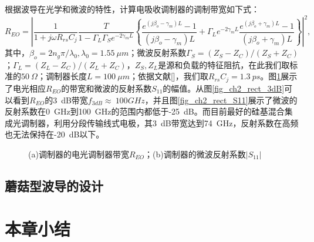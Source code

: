 根据波导在光学和微波的特性，计算电吸收调制器的调制带宽如下式\cite{li1999ultrahigh, tang2008design}：
\begin{equation}
\label{Equ:eoresponse}
R_{EO} = \left|\frac{1}{1+j\omega R_{rs} C_j}\frac{T}{1-\Gamma_L \Gamma_S  e^{-2 \gamma_m L} } \left\{\frac{e^{(j\beta_o-\gamma_m)L}-1}{(j\beta_o-\gamma_m)L}+\Gamma_L e^{-2\gamma_m L} \frac{e^{(j\beta_o+\gamma_m)L}-1}{(j\beta_o+\gamma_m)L} \right\} \right|^2,
\end{equation}
其中，$\beta_o = 2n_g\pi/\lambda_0, \lambda_0 = 1.55~\mu m $；微波反射系数$\Gamma_S=(Z_S-Z_C)/(Z_S+Z_C)$；$\Gamma_L=(Z_L-Z_C)/(Z_L+Z_C)$，$Z_S, Z_L$是源和负载的特征阻抗，在此我们取标准的$50~ \Omega$；调制器长度$L = 100~ \mu m$；依据文献[]，我们取$R_{rs} C_j=1.3~ ps$。图\ref{fig_ch2_rect_3dB_S11}展示了电光相应$R_{EO}$的带宽和微波的反射系数$S_{11}$的幅值。从图\ref{fig_ch2_rect_3dB}可以看到$R_{EO}$的3~dB带宽$f_{3dB}\approx ~100 GHz$，并且图\ref{fig_ch2_rect_S11}展示了微波的反射系数在0~GHz到100~GHz的范围内都低于-25~dB。而目前最好的硅基混合集成光调制器，利用分段传输线式电极，其3~dB带宽达到74~GHz，反射系数在高频也无法保持在-20~dB以下\cite{tang2012over}。
\begin{figure}[htb]
	\small
\caption{(a)调制器的电光调制器带宽$R_{EO}$；(b)调制器的微波反射系数$|S_{11}|$}
\label{fig_ch2_rect_3dB_S11}	
\end{figure}
		
\subsection{蘑菇型波导的设计}

\section{本章小结}
